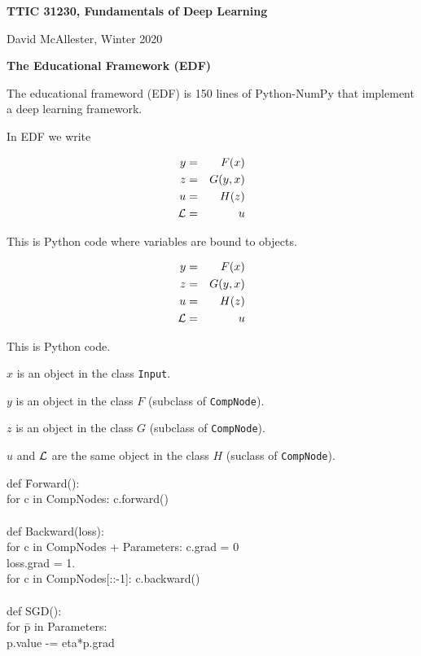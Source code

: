 




{\Huge
  
  \centerline{\bf TTIC 31230, Fundamentals of Deep Learning}
  \bigskip
  \centerline{David McAllester, Winter 2020}
  \vfill
  \vfill
  \centerline{\bf The Educational Framework (EDF)}
  \vfill
  \vfill


The educational frameword (EDF) is 150 lines of Python-NumPy that implement a deep learning framework.

\vfill
In EDF we write

\vfill
\begin{eqnarray*}
  y & = & F(x) \\
  z & = & G(y,x) \\
  u & = & H(z) \\
  {\cal L} &  = &  u
\end{eqnarray*}
\medskip

\vfill
This is Python code where variables are bound to objects.


\begin{eqnarray*}
  y & = & F(x) \\
  z & = & G(y,x) \\
  u & = & H(z) \\
  {\cal L} &  = &  u
\end{eqnarray*}

\vfill
This is Python code.

\vfill
$x$ is an object in the class {\tt Input}.

\vfill
$y$ is an object in the class $F$ (subclass of {\tt CompNode}).

\vfill
$z$ is an object in the class $G$ (subclass of {\tt CompNode}).

\medskip
$u$ and ${\cal L}$ are the same object in the class $H$ (suclass of {\tt CompNode}).


\begin{tabbing}
def \=Forward(): \\
   \>for c in CompNodes: c.forward() \\
\\
def \>Backward(loss): \\
    \> for c in CompNodes + Parameters: c.grad = 0 \\
    \> loss.grad = 1. \\
    \> for c in CompNodes[::-1]: c.backward() \\
    \\
def \> SGD(): \\
    \> for \= p in Parameters: \\
       \>\>p.value -= eta*p.grad
\end{tabbing}

}

